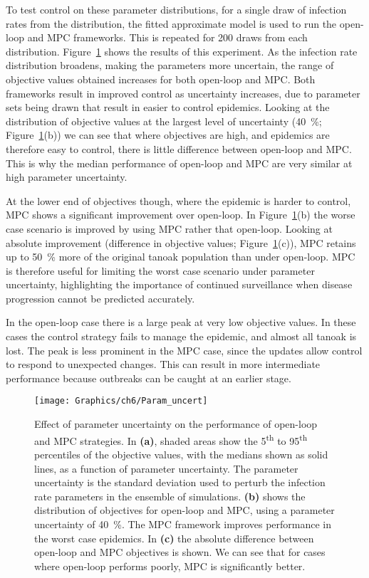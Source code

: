 To test control on these parameter distributions, for a single draw of infection rates from the distribution, the fitted approximate model is used to run the open-loop and MPC frameworks. This is repeated for 200 draws from each distribution. Figure~\ref{fig:ch6:param_uncert} shows the results of this experiment. As the infection rate distribution broadens, making the parameters more uncertain, the range of objective values obtained increases for both open-loop and MPC\@. Both frameworks result in improved control as uncertainty increases, due to parameter sets being drawn that result in easier to control epidemics. Looking at the distribution of objective values at the largest level of uncertainty (\SI{40}{\percent}; Figure~\ref{fig:ch6:param_uncert}(b)) we can see that where objectives are high, and epidemics are therefore easy to control, there is little difference between open-loop and MPC\@. This is why the median performance of open-loop and MPC are very similar at high parameter uncertainty. 

At the lower end of objectives though, where the epidemic is harder to control, MPC shows a significant improvement over open-loop. In Figure~\ref{fig:ch6:param_uncert}(b) the worse case scenario is improved by using MPC rather that open-loop. Looking at absolute improvement (difference in objective values; Figure~\ref{fig:ch6:param_uncert}(c)), MPC retains up to \SI{50}{\percent} more of the original tanoak population than under open-loop. MPC is therefore useful for limiting the worst case scenario under parameter uncertainty, highlighting the importance of continued surveillance when disease progression cannot be predicted accurately.

In the open-loop case there is a large peak at very low objective values. In these cases the control strategy fails to manage the epidemic, and almost all tanoak is lost. The peak is less prominent in the MPC case, since the updates allow control to respond to unexpected changes. This can result in more intermediate performance because outbreaks can be caught at an earlier stage.

\begin{figure}[h]
    \begin{center}
        \texttt{[image: Graphics/ch6/Param\_uncert]}
        \caption[Performance of OL and MPC under parameter uncertainty]{Effect of parameter uncertainty on the performance of open-loop and MPC strategies. In \textbf{(a)}, shaded areas show the 5\textsuperscript{th} to 95\textsuperscript{th} percentiles of the objective values, with the medians shown as solid lines, as a function of parameter uncertainty. The parameter uncertainty is the standard deviation used to perturb the infection rate parameters in the ensemble of simulations. \textbf{(b)} shows the distribution of objectives for open-loop and MPC, using a parameter uncertainty of \SI{40}{\percent}. The MPC framework improves performance in the worst case epidemics. In \textbf{(c)} the absolute difference between open-loop and MPC objectives is shown. We can see that for cases where open-loop performs poorly, MPC is significantly better.\label{fig:ch6:param_uncert}}
    \end{center}
\end{figure}
\FloatBarrier
